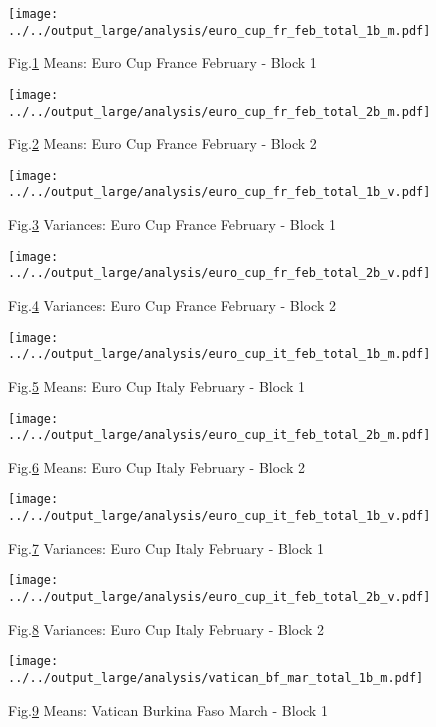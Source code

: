 \documentclass[a4paper,12pt]{article}
\begin{document}
\begin{figure}[h!]
\caption{Fig.\ref{fig:fig1} Means: Euro Cup France February - Block 1}
\texttt{[image: ../../output\_large/analysis/euro\_cup\_fr\_feb\_total\_1b\_m.pdf]}
\label{fig:fig1}
\end{figure}

\begin{figure}[h!]
\caption{Fig.\ref{fig:fig2} Means: Euro Cup France February - Block 2}
\texttt{[image: ../../output\_large/analysis/euro\_cup\_fr\_feb\_total\_2b\_m.pdf]}
\label{fig:fig2}
\end{figure}

\begin{figure}[h!]
\caption{Fig.\ref{fig:fig3} Variances: Euro Cup France February - Block 1}
\texttt{[image: ../../output\_large/analysis/euro\_cup\_fr\_feb\_total\_1b\_v.pdf]}
\label{fig:fig3}
\end{figure}

\begin{figure}[h!]
\caption{Fig.\ref{fig:fig4} Variances: Euro Cup France February - Block 2}
\texttt{[image: ../../output\_large/analysis/euro\_cup\_fr\_feb\_total\_2b\_v.pdf]}
\label{fig:fig4}
\end{figure}

\begin{figure}[h!]
\caption{Fig.\ref{fig:fig5} Means: Euro Cup Italy February - Block 1}
\texttt{[image: ../../output\_large/analysis/euro\_cup\_it\_feb\_total\_1b\_m.pdf]}
\label{fig:fig5}
\end{figure}

\begin{figure}[h!]
\caption{Fig.\ref{fig:fig6} Means: Euro Cup Italy February - Block 2}
\texttt{[image: ../../output\_large/analysis/euro\_cup\_it\_feb\_total\_2b\_m.pdf]}
\label{fig:fig6}
\end{figure}

\begin{figure}[h!]
\caption{Fig.\ref{fig:fig7} Variances: Euro Cup Italy February - Block 1}
\texttt{[image: ../../output\_large/analysis/euro\_cup\_it\_feb\_total\_1b\_v.pdf]}
\label{fig:fig7}
\end{figure}

\begin{figure}[h!]
\caption{Fig.\ref{fig:fig8} Variances: Euro Cup Italy February - Block 2}
\texttt{[image: ../../output\_large/analysis/euro\_cup\_it\_feb\_total\_2b\_v.pdf]}
\label{fig:fig8}
\end{figure}

\begin{figure}[h!]
\caption{Fig.\ref{fig:fig9} Means: Vatican Burkina Faso March - Block 1}
\texttt{[image: ../../output\_large/analysis/vatican\_bf\_mar\_total\_1b\_m.pdf]}
\label{fig:fig9}
\end{figure}
\end{document}
